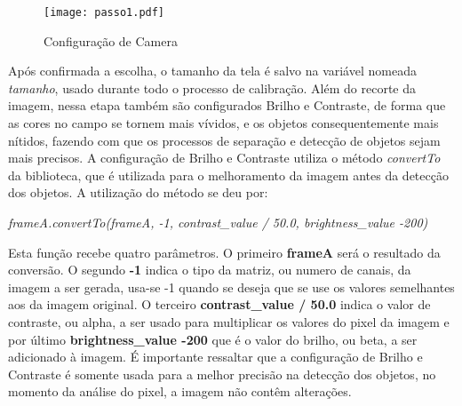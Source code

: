 \begin{figure}[H]
			\centering
			\texttt{[image: passo1.pdf]}
			\caption{ Configuração de Camera}
			\label{Configuracao}
		\end{figure}		


 Após confirmada a escolha, o tamanho da tela é salvo na variável nomeada \emph{tamanho}, usado durante todo o processo de calibração.
Além do recorte da imagem, nessa etapa também são configurados Brilho e Contraste, de forma que as cores no campo se tornem mais vívidos, e os objetos consequentemente mais nítidos, fazendo com que os processos de separação e detecção de objetos sejam mais precisos. A configuração de Brilho e Contraste utiliza o método \textit{convertTo} da biblioteca, que é utilizada para o melhoramento da imagem antes da detecção dos objetos. A utilização do método se deu por:
\begin{center}
\centering \textit{ frameA.convertTo(frameA, -1, contrast\_value / 50.0, brightness\_value -200)}
\end{center}
Esta função recebe quatro parâmetros. O primeiro \textbf{frameA} será o resultado da conversão. O segundo \textbf{-1} indica o tipo da matriz, ou numero de canais, da imagem a ser gerada, usa-se -1 quando se deseja que se use os valores semelhantes aos da imagem original\cite{OpenCV}. O terceiro \textbf{contrast\_value / 50.0} indica o valor de contraste, ou alpha, a ser usado para multiplicar os valores do pixel da imagem\cite{OpenCV} e por último \textbf{brightness\_value -200} que é o valor do brilho, ou beta, a ser adicionado à imagem. É importante ressaltar que a configuração de Brilho e Contraste é somente usada para a melhor precisão na detecção dos objetos, no momento da análise do pixel, a imagem não contêm alterações.\newline

